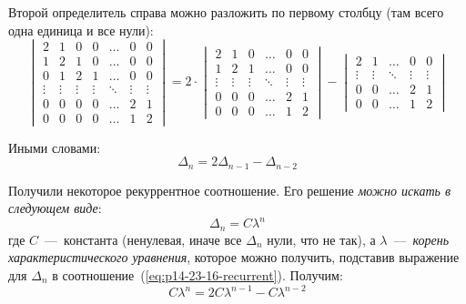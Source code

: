 \documentclass[a4paper,12pt]{article}
\theoremstyle{remark}
\begin{document}
\begin{solution}
    Второй определитель справа можно разложить по первому столбцу (там всего одна единица и все нули):
    \[
      \begin{vmatrix}
        2      & 1      & 0      & 0      & \ldots & 0      & 0\\
        1      & 2      & 1      & 0      & \ldots & 0      & 0\\
        0      & 1      & 2      & 1      & \ldots & 0      & 0\\
        \vdots & \vdots & \vdots & \vdots & \ddots & \vdots & \vdots\\
        0      & 0      & 0      & 0      & \ldots & 2      & 1\\
        0      & 0      & 0      & 0      & \ldots & 1      & 2
      \end{vmatrix}
      = 2 \cdot \begin{vmatrix}
        2      & 1      & 0      & \ldots & 0      & 0\\
        1      & 2      & 1      & \ldots & 0      & 0\\
        \vdots & \vdots & \vdots & \ddots & \vdots & \vdots\\
        0      & 0      & 0      & \ldots & 2      & 1\\
        0      & 0      & 0      & \ldots & 1      & 2
      \end{vmatrix} - \begin{vmatrix}
        2      & 1      & \ldots & 0      & 0\\
        \vdots & \vdots & \ddots & \vdots & \vdots\\
        0      & 0      & \ldots & 2      & 1\\
        0      & 0      & \ldots & 1      & 2
      \end{vmatrix}
    \]
    
    Иными словами:
    \begin{equation}\label{eq:p14-23-16-recurrent}
      \Delta_n = 2 \Delta_{n - 1} - \Delta_{n - 2}
    \end{equation}
    
    Получили некоторое рекуррентное соотношение.
    Его решение \emph{можно искать в следующем виде}:
    \[
      \Delta_n = C \lambda^n
    \]
    где $C$~---~константа (ненулевая, иначе все $\Delta_n$ нули, что не так), а $\lambda$~---~\emph{корень характеристического уравнения}, которое можно получить, подставив выражение для $\Delta_n$ в соотношение~(\ref{eq:p14-23-16-recurrent}).
    Получим:
    \[
      C \lambda^n = 2 C \lambda^{n - 1} - C \lambda^{n - 2}
    \]
    

\end{solution}
\end{document}
